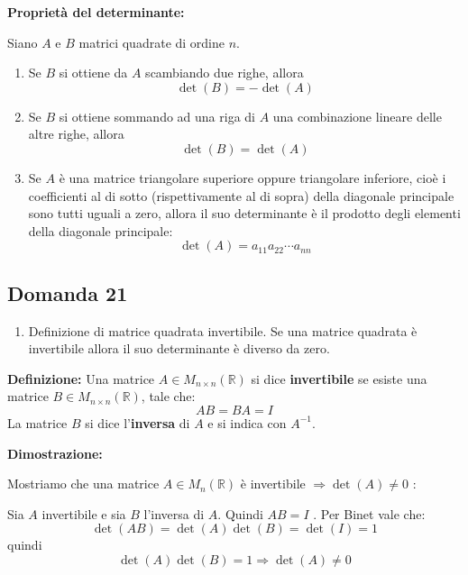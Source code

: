 \documentclass[
  a4paper,
]{article}
\providecommand{\tightlist}{%
  \setlength{\itemsep}{0pt}\setlength{\parskip}{0pt}}
\providecommand{\tightlist}{}
\begin{document}
\textbf{Proprietà del determinante:}

Siano \(A\) e \(B\) matrici quadrate di ordine \(n\).

\begin{enumerate}
\def\labelenumi{\arabic{enumi}.}
\tightlist
\item
  Se \(B\) si ottiene da \(A\) scambiando due righe, allora \[
  \det(B) = -\det(A)
  \]
\item
  Se \(B\) si ottiene sommando ad una riga di \(A\) una combinazione
  lineare delle altre righe, allora \[
  \det(B)=\det(A)
  \]
\item
  Se \(A\) è una matrice triangolare superiore oppure triangolare
  inferiore, cioè i coefficienti al di sotto (rispettivamente al di
  sopra) della diagonale principale sono tutti uguali a zero, allora il
  suo determinante è il prodotto degli elementi della diagonale
  principale: \[
  \det(A)=a_{11}a_{22}\cdots a_{nn}
  \]
\end{enumerate}

\hypertarget{domanda-21}{%
\subsection{Domanda 21}\label{domanda-21}}

\begin{observationbox}[Domanda]
\begin{enumerate}
\def\labelenumi{\arabic{enumi}.}
\setcounter{enumi}{20}
\tightlist
\item
  Definizione di matrice quadrata invertibile. Se una matrice quadrata è
  invertibile allora il suo determinante è diverso da zero.
\end{enumerate}
\end{observationbox}

\textbf{Definizione:} Una matrice \(A \in M_{n\times n}(\mathbb{R})\) si
dice \textbf{invertibile} se esiste una matrice
\(B \in M_{n\times n}(\mathbb{R})\), tale che: \[
AB = BA = I
\]La matrice \(B\) si dice l'\textbf{inversa} di \(A\) e si indica con
\(A^{-1}\).

\textbf{Dimostrazione:}

Mostriamo che una matrice \(A \in M_{n}(\mathbb{R})\) è invertibile
\(\Longrightarrow \det(A) \not = 0\) :

Sia \(A\) invertibile e sia \(B\) l'inversa di \(A\). Quindi \(AB = I\)
. Per Binet vale che: \[
\det(AB) = \det(A)\det(B) = \det(I) = 1
\] quindi \[
\det(A)\det(B)=1 \Rightarrow \det(A) \not = 0
\]
\end{document}
